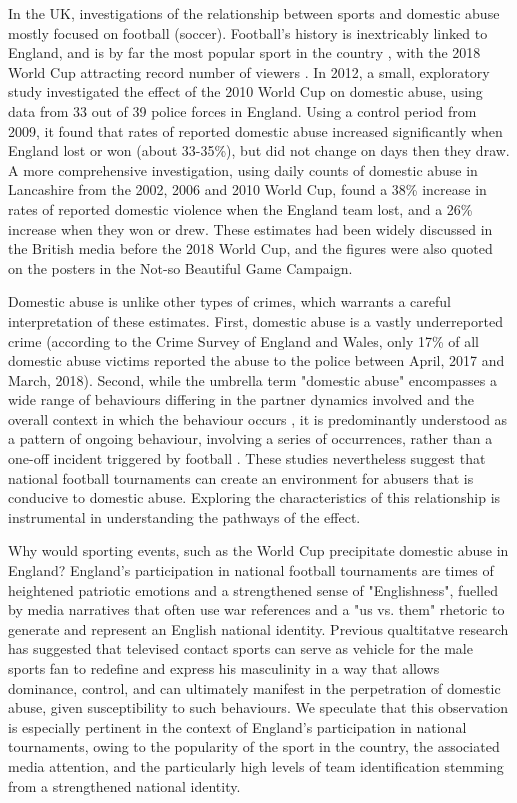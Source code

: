 \documentclass[12pt, letterpaper]{article}
\begin{document}
In the UK, investigations of the relationship between sports and domestic abuse mostly focused on football (soccer). Football's history is inextricably linked to England, and is by far the most popular sport in the country \autocite{Parry2014}, with the 2018 World Cup attracting record number of viewers \autocite{BBC}. In 2012, a small, exploratory study investigated the effect of the 2010 World Cup on domestic abuse, using data from 33 out of 39 police forces in England\autocite{Brimicombe2012}. Using a control period from 2009, it found that rates of reported domestic abuse increased significantly when England lost or won (about 33-35\%), but did not change on days then they draw. A more comprehensive investigation, using daily counts of domestic abuse in Lancashire from the 2002, 2006 and 2010 World Cup, found a 38\% increase in rates of reported domestic violence when the England team lost, and a 26\% increase when they won or drew\autocite{Kirby2014}. These estimates had been widely discussed in the British media before the 2018 World Cup, and the figures were also quoted on the posters in the Not-so Beautiful Game Campaign.  

Domestic abuse is unlike other types of crimes, which warrants a careful interpretation of these estimates. First, domestic abuse is a vastly underreported crime (according to the Crime Survey of England and Wales, only 17\% of all domestic abuse victims reported the abuse to the police between April, 2017 and March, 2018\autocite{ONS}). Second, while the umbrella term "domestic abuse" encompasses a wide range of behaviours differing in the partner dynamics involved and the overall context in which the behaviour occurs \autocite{Kelly2008}, it is predominantly understood as a pattern of ongoing behaviour, involving a series of occurrences, rather than a one-off incident triggered by football \autocite{Brooks-Hay2018}. These studies nevertheless suggest that national football tournaments can create an environment for abusers that is conducive to domestic abuse. Exploring the characteristics of this relationship is instrumental in understanding the pathways of the effect.


Why would sporting events, such as the World Cup precipitate domestic abuse in England?   England's participation in national football tournaments are times of heightened patriotic emotions and a strengthened sense of "Englishness", fuelled by media narratives that often use war references and a "us vs. them" rhetoric to generate and represent an English national identity\autocite{Vincent2014}.  Previous qualtitatve research has suggested that televised contact sports can serve as vehicle for the male sports fan to redefine and express his masculinity in a way that allows dominance, control, and can ultimately manifest in the perpetration of domestic abuse, given susceptibility to such behaviours\autocite{Sabo,Swallow}. We speculate that this observation is especially pertinent in the context of England's participation in national tournaments, owing to the popularity of the sport in the country, the associated media attention, and the particularly high levels of team identification stemming from a strengthened national identity. 
\end{document}
